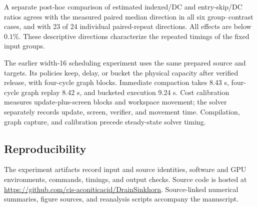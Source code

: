 A separate post-hoc comparison of estimated indexed/DC and entry-skip/DC ratios agrees with the measured paired median direction in all six group--contrast cases, and with 23 of 24 individual paired-repeat directions. All effects are below $0.1\%$. These descriptive directions characterize the repeated timings of the fixed input groups.

The earlier width-16 scheduling experiment uses the same prepared source and targets. Its policies keep, delay, or bucket the physical capacity after verified release, with four-cycle graph blocks. Immediate compaction takes 8.43 s, four-cycle graph replay 8.42 s, and bucketed execution 9.24 s. Cost calibration measures update-plus-screen blocks and workspace movement; the solver separately records update, screen, verifier, and movement time. Compilation, graph capture, and calibration precede steady-state solver timing.



\subsection{Reproducibility}



The experiment artifacts record input and source identities, software and GPU environments, commands, timings, and output checks. Source code is hosted at \url{https://github.com/cis-aconiticacid/DrainSinkhorn}. Source-linked numerical summaries, figure sources, and reanalysis scripts accompany the manuscript.
